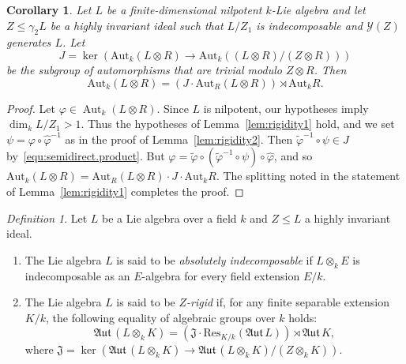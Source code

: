 \documentclass[11pt,a4paper]{amsart}
\theoremstyle{plain}
\newtheorem{cor}[thm]{Corollary}
\theoremstyle{remark}
\newtheorem{dfn}[thm]{Definition}
\newcommand{\tensor}{\otimes}
\DeclareMathOperator{\Aut}{Aut}
\def \aAut {\mathfrak{Aut} \,}
\begin{document}
\begin{cor} \label{cor:semidirect.product}
Let $L$ be a finite-dimensional nilpotent $k$-Lie algebra and let $Z \leq \gamma_2 L$ be a highly invariant ideal such that $L/Z_1$ is indecomposable and $\mathcal{Y}(Z)$ generates $L$.  Let 
$$J = \ker (\mathrm{Aut}_k (L \otimes R) \to \mathrm{Aut}_k ((L \otimes R)/(Z \otimes R))) $$
be the subgroup of automorphisms that are trivial modulo $Z \otimes R$.  Then
$$ \mathrm{Aut}_k (L \otimes R) = ( J \cdot \mathrm{Aut}_R (L \otimes R)) \rtimes \mathrm{Aut}_k R.$$
\end{cor}
\begin{proof}
Let $\varphi \in \Aut_k (L \tensor R)$.  Since $L$ is nilpotent, our hypotheses imply $\dim_k L/Z_1 > 1$.  Thus the hypotheses of Lemma~\ref{lem:rigidity1} hold, and we set $\psi = \varphi \circ \widehat{\varphi}^{-1} $ as in the proof of Lemma~\ref{lem:rigidity2}.   Then $\widetilde{\varphi}^{-1} \circ \psi \in J$ by~\eqref{equ:semidirect.product}.  But 
$\varphi = \widetilde{\varphi} \circ (\widetilde{\varphi}^{-1} \circ \psi) \circ \widehat{\varphi}$, 
and so $  \mathrm{Aut}_k (L \otimes R) = \mathrm{Aut}_R (L \otimes R) \cdot J \cdot \mathrm{Aut}_k R$.  The splitting noted in the statement of Lemma~\ref{lem:rigidity1} completes the proof.
\end{proof}

\begin{dfn} \label{def:rigidity}
Let $L$ be a Lie algebra over a field $k$ and $Z \leq L$ a highly invariant ideal.
\begin{enumerate}
\item The Lie algebra $L$ is said to be {\emph{absolutely indecomposable}} if $L \tensor_k E$ is indecomposable as an $E$-algebra for every field extension $E/k$.
\item The Lie algebra $L$ is said to be {\emph{$Z$-rigid}} if, for any finite separable extension $K/k$, the following equality of algebraic groups over $k$ holds:
\begin{equation*}
\aAut (L \tensor_k K) = (\mathfrak{J} \cdot \mathrm{Res}_{K/k} (\aAut L)) \rtimes \aAut K,
\end{equation*}
where $\mathfrak{J} = \ker (\aAut (L \tensor_k K) \to \aAut (L \tensor_k K)/(Z \tensor_k K))$.
\end{enumerate}
\end{dfn}
\end{document}
